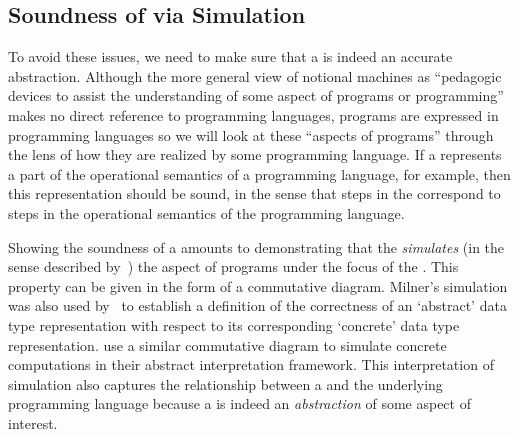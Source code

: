 \subsection{Soundness of \NMs{} via Simulation}
To avoid
these issues,
we need to make sure that a \nm{} 
is indeed an accurate abstraction.
%
Although
the more general view of
notional machines
as ``pedagogic devices to assist the understanding of some aspect of programs or programming''~\citep{fincherNotionalMachinesComputing2020}
makes no direct reference to programming languages,
programs are expressed in programming languages
so we will look at these ``aspects of programs''
through the lens of how they are realized by some programming language.
%
If a \nm{}
represents
a part of the operational semantics of a programming language,
for example,
then
this
representation
should be sound, in the sense that
steps in the \nm{}
correspond to steps in the operational semantics of the programming language.


Showing the soundness of a \nm{}
amounts to demonstrating that
the \nm{} \emph{simulates}
(in the sense described by~\citet{milnerAlgebraicDefinitionSimulation1971})
the aspect of programs under the focus of the \nm{}.
%
This property can be given in the form of a commutative diagram.
%
Milner's simulation was also used
by~\citet{hoareProofCorrectnessData1972}
to establish a definition of
the correctness of
an `abstract' data type representation
with respect to
its corresponding `concrete' data type representation.
%
\citet{cousotAbstractInterpretationUnified1977} use a similar commutative diagram to simulate concrete computations in their abstract interpretation framework.
%
This interpretation of simulation
also captures the relationship between a \nm{} and the underlying programming language
because
a \nm{} is indeed an \emph{abstraction} of some aspect of interest.


